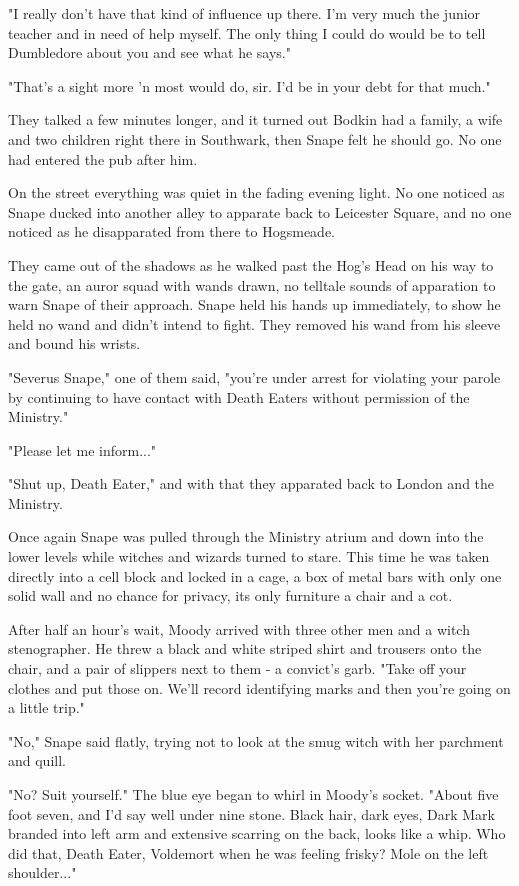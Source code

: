 "I really don't have that kind of influence up there. I'm very much the junior teacher and in need of help myself. The only thing I could do would be to tell Dumbledore about you and see what he says."

"That's a sight more 'n most would do, sir. I'd be in your debt for that much."

They talked a few minutes longer, and it turned out Bodkin had a family, a wife and two children right there in Southwark, then Snape felt he should go. No one had entered the pub after him.

On the street everything was quiet in the fading evening light. No one noticed as Snape ducked into another alley to apparate back to Leicester Square, and no one noticed as he disapparated from there to Hogsmeade.

They came out of the shadows as he walked past the Hog's Head on his way to the gate, an auror squad with wands drawn, no telltale sounds of apparation to warn Snape of their approach. Snape held his hands up immediately, to show he held no wand and didn't intend to fight. They removed his wand from his sleeve and bound his wrists.

"Severus Snape," one of them said, "you're under arrest for violating your parole by continuing to have contact with Death Eaters without permission of the Ministry."

"Please let me inform..."

"Shut up, Death Eater," and with that they apparated back to London and the Ministry.

Once again Snape was pulled through the Ministry atrium and down into the lower levels while witches and wizards turned to stare. This time he was taken directly into a cell block and locked in a cage, a box of metal bars with only one solid wall and no chance for privacy, its only furniture a chair and a cot.

After half an hour's wait, Moody arrived with three other men and a witch stenographer. He threw a black and white striped shirt and trousers onto the chair, and a pair of slippers next to them - a convict's garb. "Take off your clothes and put those on. We'll record identifying marks and then you're going on a little trip."

"No," Snape said flatly, trying not to look at the smug witch with her parchment and quill.

"No? Suit yourself." The blue eye began to whirl in Moody's socket. "About five foot seven, and I'd say well under nine stone. Black hair, dark eyes, Dark Mark branded into left arm and extensive scarring on the back, looks like a whip. Who did that, Death Eater, Voldemort when he was feeling frisky? Mole on the left shoulder..."

